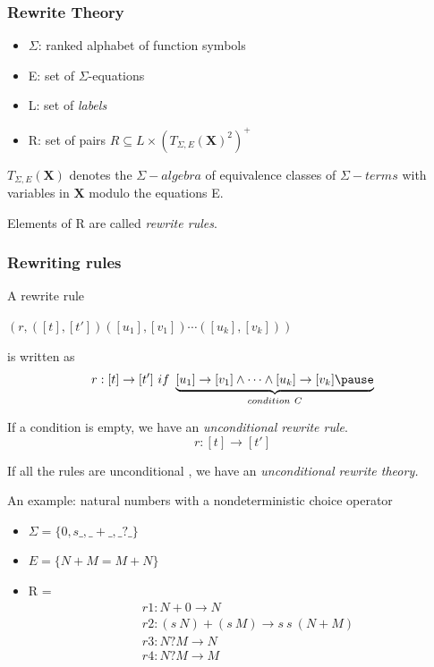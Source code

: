 \documentclass{beamer}
\begin{document}
\begin{frame}
    \frametitle{Rewrite Theory}
    \begin{center}
    \end{center}
    
    \bigskip
    \begin{itemize}
        \pause
        \item $\Sigma$: ranked alphabet of function symbols
        \pause
        \item E: set  of $\Sigma$-equations 
        \pause
        \item L: set of \emph{labels}
        \pause
        \item R: set of pairs $R \subseteq L \times (T_{\Sigma, E}(\mathbf{X})^2)^+$
    \end{itemize}
    
    \pause
    \bigskip
    $T_{\Sigma,E}(\mathbf{X})$ denotes the $\Sigma-algebra$ of equivalence classes of $\Sigma-terms$ with variables in $\mathbf{X}$ modulo the equations E.
    
    \medskip
    Elements of R are called \emph{rewrite rules}.
\end{frame}
\begin{frame}
    \frametitle{Rewriting rules}
    A rewrite rule 
    \begin{center}
        $(r,([t],[t'])([u_1],[v_1])\cdots([u_k],[v_k]))$
    \end{center}
    is written as 
    $$
    r:[t] \rightarrow [t']\ if\ \underbrace{[u_1]\rightarrow[v_1] \wedge \cdots \wedge [u_k] \rightarrow [v_k] \pause}_{condition\ C}
    $$
    
    \bigskip
    \pause
    If a condition is empty, we have an \emph{unconditional rewrite rule}.
    $$
    r:[t] \rightarrow [t']
    $$
    

    If all the rules are unconditional , we have an \emph{unconditional rewrite theory.}
\end{frame}
\begin{frame}

    An example: natural numbers with a nondeterministic choice operator 
    
    \pause
    \begin{itemize}
        \item $\Sigma = \{0,s\_,\_+\_,\_?\_\}$
        \pause
        \item $E = \{N + M = M + N\}$
        \pause
        \item R = 
            \vspace{-5mm}
            \begin{align*}
                &r1: N+0 \rightarrow N \\ 
                &r2: (s\ N) + (s\ M) \rightarrow s\ s\ (N + M) \\ 
                &r3: N ? M \rightarrow N \\ 
                &r4: N ? M \rightarrow M 
            \end{align*}
    \end{itemize}
\end{frame}
\end{document}
